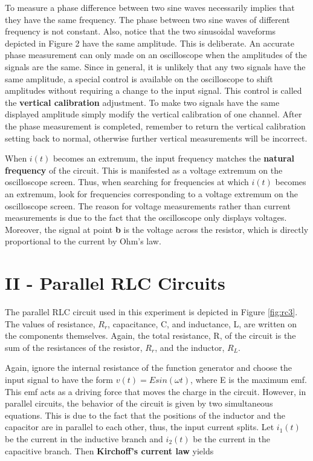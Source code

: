 To measure a phase difference between two sine waves necessarily implies that they have the same frequency. The phase between two sine waves of different frequency is not constant. Also, notice that the two sinusoidal waveforms depicted in Figure 2 have the same amplitude. This is deliberate. An accurate phase measurement can only made on an oscilloscope when the amplitudes of the signals are the same. Since in general, it is unlikely that any two signals have the same amplitude, a special control is available on the oscilloscope to shift amplitudes without requiring a change to the input signal. This control is called the {\bf vertical calibration} adjustment. To make two signals have the same displayed amplitude simply modify the vertical calibration of one channel. After the phase measurement is completed, remember to return the vertical calibration setting back to normal, otherwise further vertical measurements will be incorrect.

When $i(t)$ becomes an extremum, the input frequency matches the {\bf natural frequency} of the circuit. This is manifested as a voltage extremum on the oscilloscope screen. Thus, when searching for frequencies at which $i(t)$ becomes an extremum, look for frequencies corresponding to a voltage extremum on the oscilloscope screen. The reason for voltage measurements rather than current measurements is due to the fact that the oscilloscope only displays voltages. Moreover, the signal at point {\bf b} is the voltage across the resistor, which is directly proportional to the current by Ohm's law.

\section{II - Parallel RLC Circuits}
The parallel RLC circuit used in this experiment is depicted in Figure \ref{fig:rc3}. The values of resistance, $R_r$, capacitance, C, and inductance, L, are written on the components themselves. Again, the total resistance, R, of the circuit is the sum of the resistances of the resistor, $R_r$, and the inductor, $R_L$.

Again, ignore the internal resistance of the function generator and choose the input signal to have the form $v(t)=Esin(\omega t)$, where E is the maximum emf. This emf acts as a driving force that moves the charge in the circuit. However, in parallel circuits, the behavior of the circuit is given by two simultaneous equations. This is due to the fact that the positions of the inductor and the capacitor are in parallel to each other, thus, the input current splits. Let $i_1(t)$ be the current in the inductive branch and $i_2(t)$ be the current in the capacitive branch. Then {\bf Kirchoff's current law} yields

